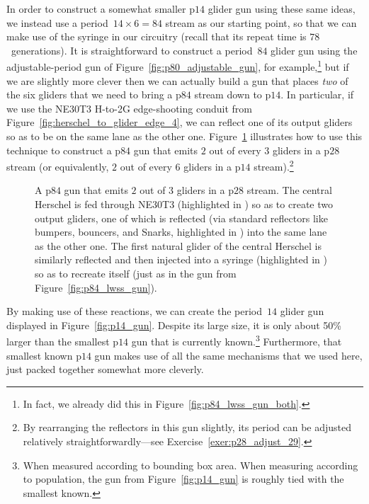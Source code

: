 In order to construct a somewhat smaller p$14$ glider gun using these same ideas, we instead use a period~$14 \times 6 = 84$ stream as our starting point, so that we can make use of the syringe in our circuitry (recall that its repeat time is $78$~generations). It is straightforward to construct a period~$84$ glider gun using the adjustable-period gun of Figure~\ref{fig:p80_adjustable_gun}, for example,\footnote{In fact, we already did this in Figure~\ref{fig:p84_lwss_gun_both}.} but if we are slightly more clever then we can actually build a gun that places \emph{two} of the six gliders that we need to bring a p$84$ stream down to p$14$. In particular, if we use the NE30T3 H-to-2G edge-shooting conduit from Figure~\ref{fig:herschel_to_glider_edge_4}, we can reflect one of its output gliders so as to be on the same lane as the other one. Figure~\ref{fig:p14_pieces_p84} illustrates how to use this technique to construct a p$84$ gun that emits $2$ out of every $3$ gliders in a p$28$ stream (or equivalently, $2$ out of every $6$ gliders in a p$14$ stream).\footnote{By rearranging the reflectors in this gun slightly, its period can be adjusted relatively straightforwardly---see Exercise~\ref{exer:p28_adjust_29}.}

\begin{figure}[!htb]
	\centering
	\caption{A p$84$ gun that emits $2$ out of $3$ gliders in a p$28$ stream. The central Herschel is fed through NE30T3 (highlighted in ) so as to create two output gliders, one of which is reflected (via standard reflectors like bumpers, bouncers, and Snarks, highlighted in ) into the same lane as the other one. The first natural glider of the central Herschel is similarly reflected and then injected into a syringe (highlighted in ) so as to recreate itself (just as in the gun from Figure~\ref{fig:p84_lwss_gun}).}
	\label{fig:p14_pieces_p84}
\end{figure}

By making use of these reactions, we can create the period~$14$ glider gun displayed in Figure~\ref{fig:p14_gun}. Despite its large size, it is only about 50\% larger than the smallest p$14$ gun that is currently known.\footnote{When measured according to bounding box area. When measuring according to population, the gun from Figure~\ref{fig:p14_gun} is roughly tied with the smallest known.} Furthermore, that smallest known p$14$ gun makes use of all the same mechanisms that we used here, just packed together somewhat more cleverly.

